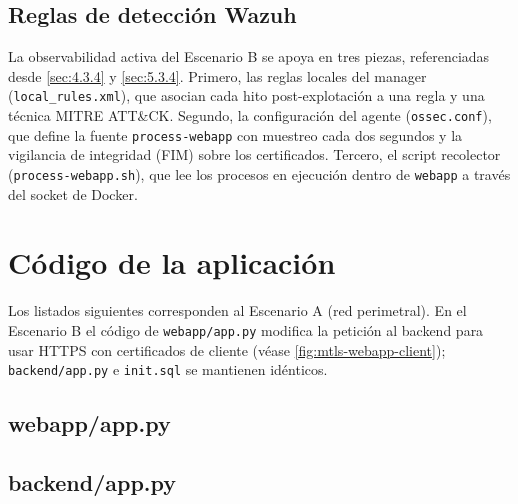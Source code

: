 \documentclass[11pt,spanish,listoffigures,listoftables]{tfgetsinf}
\begin{document}


\section{Reglas de detección Wazuh}

La observabilidad activa del Escenario B se apoya en tres piezas, referenciadas desde \cref{sec:4.3.4} y \cref{sec:5.3.4}. Primero, las reglas locales del manager (\texttt{local\_rules.xml}), que asocian cada hito post-explotación a una regla y una técnica MITRE ATT\&CK. Segundo, la configuración del agente (\texttt{ossec.conf}), que define la fuente \texttt{process-webapp} con muestreo cada dos segundos y la vigilancia de integridad (FIM) sobre los certificados. Tercero, el script recolector (\texttt{process-webapp.sh}), que lee los procesos en ejecución dentro de \texttt{webapp} a través del socket de Docker.







\chapter{Código de la aplicación}
\label{anexo:codigo_aplicacion}

Los listados siguientes corresponden al Escenario A (red perimetral). En el Escenario B el código de \texttt{webapp/app.py} modifica la petición al backend para usar HTTPS con certificados de cliente (véase \cref{fig:mtls-webapp-client}); \texttt{backend/app.py} e \texttt{init.sql} se mantienen idénticos.

\section{webapp/app.py}


\section{backend/app.py}

\end{document}
